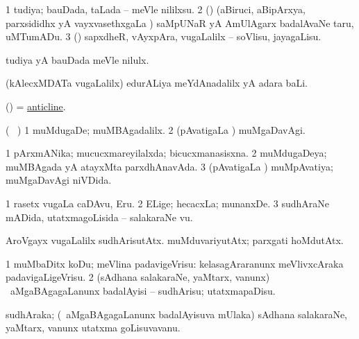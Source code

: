 \bentry
{} 
\gl{\sakirx}
\expl{}
\bmng
\bnum
\num{1} tudiya; bauDada, taLada -- meVle nililxsu. 
\num{2} (\AmA) (aBiruci, aBipArxya, parxsididhx yA vayxvasethxgaLa \vi) saMpUNaR yA AmUlAgarx badalAvaNe taru, uMTumADu. 
\num{3} (\AmA) sapxdheR, vAyxpAra, \mo vugaLalilx -- soVlisu, jayagaLisu. 
\enum
\emng

\noindent
\gl{\akirx}
\expl{}
\bmng
tudiya yA bauDada meVle nilulx. 
\emng
\eentry

\bentry
{} 
\gl{\kirxvi}
\expl{}
\bmng
(kAlecxMDATa \mo vugaLalilx) edurALiya meYdAnadalilx yA adara baLi. 
\emng
\eentry

\bentry
{} 
\gl{\nA}
\expl{}
\bmng
(\BUvi) = \hyperref{kandict_a.pdf}{A}{anticline}{anticline}. 
\emng
\eentry

\bentry
{} 
\gl{\kirxvi}
\expl{}
\bmng
(\sA\  ) 
\bnum
\num{1} muMdugaDe; muMBAgadalilx. 
\num{2} (pAvatigaLa \vi) muMgaDavAgi. 
\enum
\emng
\eentry

\bentry
{} 
\gl{\gu}
\expl{}
\bmng
\bnum
\num{1} pArxmANika; mucucxmareyilalxda; bicucxmanasisxna. 
\num{2} muMdugaDeya; muMBAgada yA atayxMta parxdhAnavAda. 
\num{3} (pAvatigaLa \vi) muMpAvatiya; muMgaDavAgi niVDida. 
\enum
\emng
\eentry

\bentry
{} 
\gl{\nA}
\expl{}
\bmng
\bnum
\num{1} rasetx \mo vugaLa caDAvu, Eru. 
\num{2} ELige; hecacxLa; munanxDe. 
\num{3} sudhAraNe mADida, utatxmagoLisida -- salakaraNe \mo vu. 
\enum
\emng

\noindent
\gl{\pagu}
\expl{}
\bmng
{} 
\banum
{} AroVgayx \mo vugaLalilx sudhArisutAtx. 
 muMduvariyutAtx; parxgati hoMdutAtx. 
\eanum
\emng
\eentry

\bentry
{} 
\gl{\sakirx}
\expl{}
\bmng
\bnum
\num{1} muMbaDitx koDu; meVlina padavigeVrisu:  kelasagAraranunx meVlivxcAraka padavigaLigeVrisu. 
\num{2} (sAdhana salakaraNe, yaMtarx, \mo vanunx) \kanmu\ aMgaBAgagaLanunx badalAyisi -- sudhArisu; utatxmapaDisu. 
\enum
\emng
\eentry

\bentry
{} 
\gl{\nA}
\expl{}
\bmng
sudhAraka; (\kanmu\ aMgaBAgagaLanunx badalAyisuva mUlaka) sAdhana salakaraNe, yaMtarx, \mo vanunx utatxma goLisuvavanu. 
\emng
\eentry

